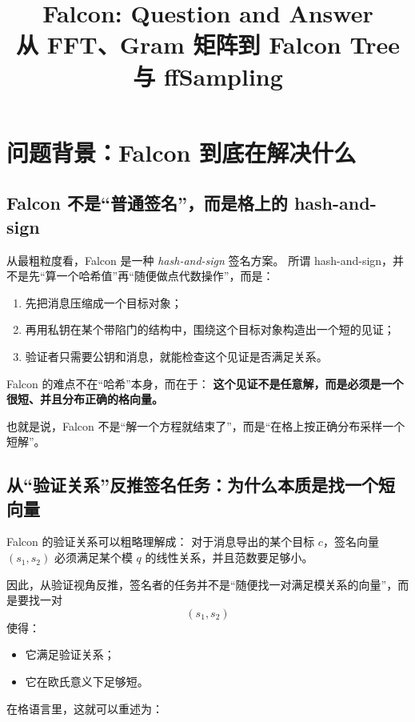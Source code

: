 \documentclass[11pt,a4paper]{ctexart}
\title{\textbf{Falcon: Question and Answer}\\[0.5em]
\large 从 FFT、Gram 矩阵到 Falcon Tree 与 ffSampling}
\author{}
\date{}
\begin{document}
\maketitle
\tableofcontents
\newpage

\section{问题背景：Falcon 到底在解决什么}

\subsection{Falcon 不是“普通签名”，而是格上的 hash-and-sign}

从最粗粒度看，Falcon 是一种 \emph{hash-and-sign} 签名方案。  
所谓 hash-and-sign，并不是先“算一个哈希值”再“随便做点代数操作”，而是：

\begin{enumerate}
    \item 先把消息压缩成一个目标对象；
    \item 再用私钥在某个带陷门的结构中，围绕这个目标对象构造出一个短的见证；
    \item 验证者只需要公钥和消息，就能检查这个见证是否满足关系。
\end{enumerate}

Falcon 的难点不在“哈希”本身，而在于：  
\textbf{这个见证不是任意解，而是必须是一个很短、并且分布正确的格向量。}

也就是说，Falcon 不是“解一个方程就结束了”，而是“在格上按正确分布采样一个短解”。

\subsection{从“验证关系”反推签名任务：为什么本质是找一个短向量}

Falcon 的验证关系可以粗略理解成：  
对于消息导出的某个目标 \(c\)，签名向量 \((s_1,s_2)\) 必须满足某个模 \(q\) 的线性关系，并且范数要足够小。

因此，从验证视角反推，签名者的任务并不是“随便找一对满足模关系的向量”，而是要找一对
\[
(s_1,s_2)
\]
使得：

\begin{itemize}
    \item 它满足验证关系；
    \item 它在欧氏意义下足够短。
\end{itemize}

在格语言里，这就可以重述为：
\end{document}
